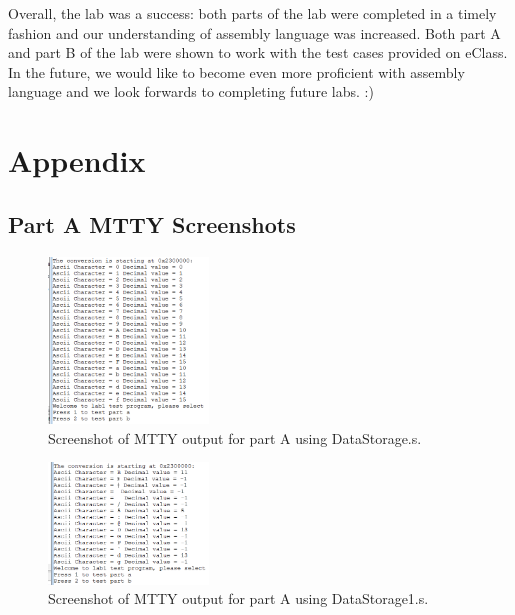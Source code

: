 \documentclass[10pt, letterpaper, titlepage]{article} %
\begin{document}
\begin{multicols*}{2}
Overall, the lab was a success: both parts of the lab were completed in a timely fashion and our understanding of assembly language was increased. 
Both part A and part B of the lab were shown to work with the test cases provided on eClass.
In the future, we would like to become even more proficient with assembly language and we look forwards to completing future labs. :)

\end{multicols*}

\newpage

\section{Appendix}
\subsection{Part A MTTY Screenshots}
\begin{figure}[H]
   \includegraphics[width=0.38\textwidth]{PartA_1.png}
   \centering  
   \caption{Screenshot of MTTY output for part A using DataStorage.s.} 
   \label{figure:3}
\end{figure}

\begin{figure}[H]
   \includegraphics[width=0.38\textwidth]{PartA_2.png}
   \centering  
   \caption{Screenshot of MTTY output for part A using DataStorage1.s.} 
   \label{figure:4}
\end{figure}
\end{document}

